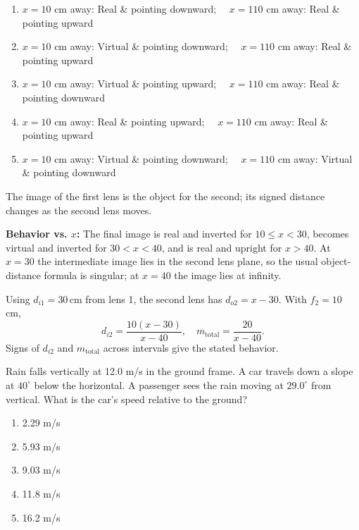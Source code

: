 \begin{enumerate}[label=(\Alph*)]
    \item $x=10$ cm away: Real \& pointing downward; $\quad x=110$ cm away: Real \& pointing upward
    \item $x=10$ cm away: Virtual \& pointing downward; $\quad x=110$ cm away: Real \& pointing upward
    \item $x=10$ cm away: Virtual \& pointing upward; $\quad x=110$ cm away: Real \& pointing downward
    \item $x=10$ cm away: Real \& pointing upward; $\quad x=110$ cm away: Real \& pointing upward
    \item $x=10$ cm away: Virtual \& pointing downward; $\quad x=110$ cm away: Virtual \& pointing downward
\end{enumerate}

\begin{answerbox}
\end{answerbox}
\begin{insightbox}
The image of the first lens is the object for the second; its signed distance changes as the second lens moves.
\end{insightbox}
\begin{solutionbox}
\textbf{Behavior vs. $x$:} The final image is real and inverted for $10\le x<30$, becomes virtual and inverted for $30<x<40$, and is real and upright for $x>40$. At $x=30$ the intermediate image lies in the second lens plane, so the usual object-distance formula is singular; at $x=40$ the image lies at infinity.

Using $d_{i1}=30\,\text{cm}$ from lens 1, the second lens has $d_{o2}=x-30$. With $f_2=10$ cm,
\[ d_{i2}=\frac{10(x-30)}{x-40}, \quad m_{\text{total}}=\frac{20}{x-40}. \]
Signs of $d_{i2}$ and $m_{\text{total}}$ across intervals give the stated behavior.
\end{solutionbox}

\item \label{prob:26}
Rain falls vertically at 12.0 m/s in the ground frame. A car travels down a slope at $40^\circ$ below the horizontal. A passenger sees the rain moving at $29.0^\circ$ from vertical. What is the car's speed relative to the ground?
\begin{enumerate}[label=(\Alph*)]
    \item 2.29 m/s
    \item 5.93 m/s
    \item 9.03 m/s
    \item 11.8 m/s
    \item 16.2 m/s
\end{enumerate}

